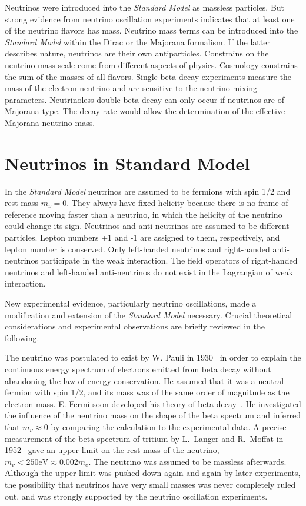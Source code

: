 Neutrinos were introduced into the \emph{Standard Model} as massless particles. But strong evidence from neutrino oscillation experiments indicates that at least one of the neutrino flavors has mass. Neutrino mass terms can be introduced into the \emph{Standard Model} within the Dirac or the Majorana formalism. If the latter describes nature, neutrinos are their own antiparticles. Constrains on the neutrino mass scale come from different aspects of physics. Cosmology constrains the sum of the masses of all flavors. Single beta decay experiments measure the mass of the electron neutrino and are sensitive to the neutrino mixing parameters. Neutrinoless double beta decay can only occur if neutrinos are of Majorana type. The decay rate would allow the determination of the effective Majorana neutrino mass.

\section{Neutrinos in Standard Model}
\label{sec:sm}
In the \emph{Standard Model} neutrinos are assumed to be fermions with spin 1/2 and rest mass $m_\nu=0$. They always have fixed helicity because there is no frame of reference moving faster than a neutrino, in which the helicity of the neutrino could change its sign. Neutrinos and anti-neutrinos are assumed to be different particles. Lepton numbers +1 and -1 are assigned to them, respectively, and lepton number is conserved. Only left-handed neutrinos and right-handed anti-neutrinos participate in the weak interaction. The field operators of right-handed neutrinos and left-handed anti-neutrinos do not exist in the Lagrangian of weak interaction.

New experimental evidence, particularly neutrino oscillations, made a modification and extension of the \emph{Standard Model} necessary. Crucial theoretical considerations and experimental observations are briefly reviewed in the following.

The neutrino was postulated to exist by W. Pauli in 1930~\cite{Pau30} in order to explain the continuous energy spectrum of electrons emitted from beta decay without abandoning the law of energy conservation. He assumed that it was a neutral fermion with spin 1/2, and its mass was of the same order of magnitude as the electron mass. E.  Fermi soon developed his theory of beta decay~\cite{Fer33,Fer34}. He investigated the influence of the neutrino mass on the shape of the beta spectrum and inferred that $m_\nu \approx 0$ by comparing the calculation to the experimental data. A precise measurement of the beta spectrum of tritium by L.~Langer and R.~Moffat in 1952~\cite{Lan52} gave an upper limit on the rest mass of the neutrino, $m_\nu < 250 \mbox{eV} \approx 0.002m_e$. The neutrino was assumed to be massless afterwards. Although the upper limit was pushed down again and again by later experiments, the possibility that neutrinos have very small masses was never completely ruled out, and was strongly supported by the neutrino oscillation experiments.

